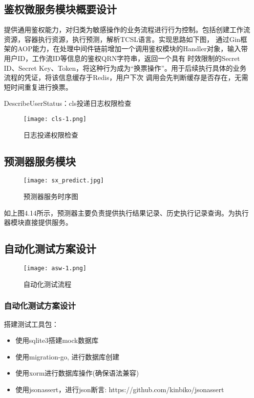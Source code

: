 \subsection{鉴权微服务模块概要设计}

提供通用鉴权能力，对归类为敏感操作的业务流程进行行为控制。包括创建工作流资源，容器执行资源，执行预测，解析TCSL语言。实现思路如下图，
通过Gin框架的AOP能力，在处理中间件链前增加一个调用鉴权模块的Handler对象，输入带用户ID，工作流ID等信息的鉴权QRN字符串，返回一个具有
时效限制的Secret ID、Secret Key、Token，将这种行为成为“换票操作”。用于后续执行具体的业务流程的凭证，将该信息缓存于Redis，用户下次
调用会先判断缓存是否存在，无需短时间重复进行换票。

DescribeUserStatus：cls投递日志权限检查

\begin{figure}[H]
    \centering
    \texttt{[image: cls-1.png]}
    \caption{日志投递权限检查}
    \label{fig:rztdqx}
\end{figure}


\subsection{预测器服务模块}

\begin{figure}[H]
    \centering
    \texttt{[image: sx\_predict.jpg]}
    \caption{预测器服务时序图}
    \label{fig:预测器服务时序图}
\end{figure}

如上图4.14所示，预测器主要负责提供执行结果记录、历史执行记录查询。为执行器模块直接提供服务。\cite{le2021deep}



\subsection{自动化测试方案设计}

\begin{figure}[H]
    \centering
    \texttt{[image: asw-1.png]}
    \caption{自动化测试流程}
    \label{fig:自动化测试流程}
\end{figure}



\subsubsection{自动化测试方案设计}

搭建测试工具包：
\begin{itemize}
    \item 使用sqlite3搭建mock数据库
    \item 使用migration-go, 进行数据库创建
    \item 使用xorm进行数据库操作(确保语法兼容)
    \item 使用jsonassert，进行json断言: https://github.com/kinbiko/jsonassert
\end{itemize}


